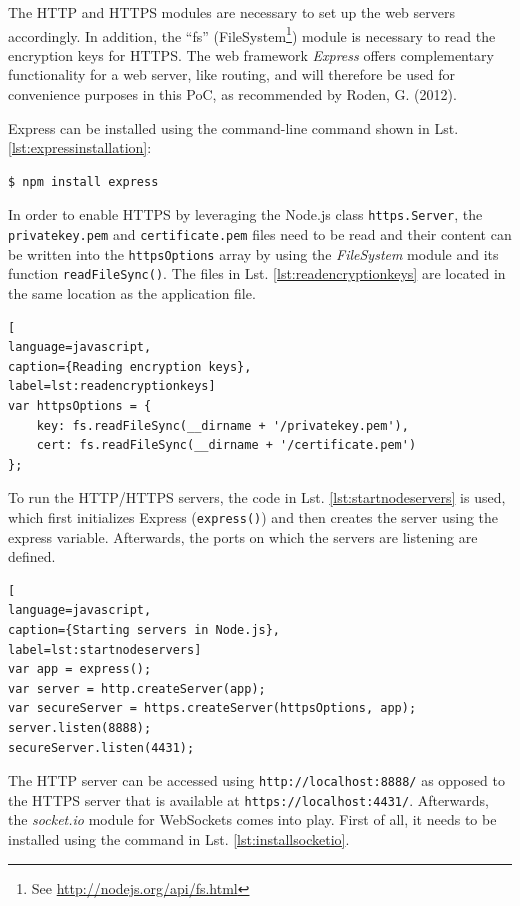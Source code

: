 The HTTP and HTTPS modules are necessary to set up the web servers accordingly. 
In addition, the “fs” (FileSystem\footnote{See \url{ http://nodejs.org/api/fs.html}}) module is necessary to read the encryption keys for HTTPS. The web framework \textit{Express} offers complementary functionality for a web server, like routing, 
and will therefore be used for convenience purposes in this PoC, as recommended by Roden, G. (2012). 

Express can be installed using the command-line command shown in Lst. \ref{lst:expressinstallation}:\\

\begin{lstlisting}[language=javascript,
caption={Installing Express via command-line},
label=lst:expressinstallation,
morekeywords={npm}]
$ npm install express 
\end{lstlisting}%

In order to enable HTTPS by leveraging the Node.js class \texttt{https.Server}, the \texttt{privatekey.pem} and \texttt{certificate.pem} files need to be read and their content can be written into the \texttt{httpsOptions} array by using the \textit{FileSystem} module and its function \texttt{readFileSync()}. The files in Lst. \ref{lst:readencryptionkeys} are located in the same location as the application file.

\begin{lstlisting}[
language=javascript,
caption={Reading encryption keys},
label=lst:readencryptionkeys]
var httpsOptions = {
    key: fs.readFileSync(__dirname + '/privatekey.pem'),
    cert: fs.readFileSync(__dirname + '/certificate.pem')
};
\end{lstlisting}

To run the HTTP/HTTPS servers, the code in Lst. \ref{lst:startnodeservers} is used, which first
initializes Express (\texttt{express()}) and then creates the server using the express variable.
Afterwards, the ports on which the servers are listening are defined.

\begin{lstlisting}[
language=javascript,
caption={Starting servers in Node.js},
label=lst:startnodeservers]
var app = express();
var server = http.createServer(app);
var secureServer = https.createServer(httpsOptions, app);
server.listen(8888);
secureServer.listen(4431);
\end{lstlisting}

The HTTP server can be accessed using \texttt{http://localhost:8888/} as opposed to the
HTTPS server that is available at \texttt{https://localhost:4431/}. Afterwards, the
\textit{socket.io} module for WebSockets comes into play. First of all, it needs to be
installed using the command in Lst. \ref{lst:installsocketio}.

